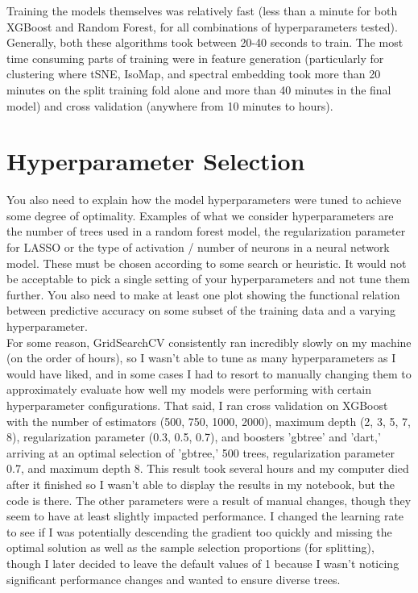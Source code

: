 \documentclass[12pt]{article}
\newtheorem{Proof of Lemma}{Proof of Lemma}
\begin{document}
Training the models themselves was relatively fast (less than a minute for both XGBoost and Random Forest, for all combinations of hyperparameters tested). Generally, both these algorithms took between 20-40 seconds to train. The most time consuming parts of training were in feature generation (particularly for clustering where tSNE, IsoMap, and spectral embedding took more than 20 minutes on the split training fold alone and more than 40 minutes in the final model) and cross validation (anywhere from 10 minutes to hours).

\section{Hyperparameter Selection}
You also need to explain how the model hyperparameters were tuned to achieve some degree of optimality. Examples of what we consider hyperparameters are the number of trees used in a random forest model, the regularization parameter for LASSO or the type of activation / number of neurons in a neural network model. These must be chosen according to some search or heuristic. It would not be acceptable to pick a single setting of your hyperparameters and not tune them further. You also need to make at least one plot showing the functional relation between predictive accuracy on some subset of the training data and a varying hyperparameter. \\

For some reason, GridSearchCV consistently ran incredibly slowly on my machine (on the order of hours), so I wasn't able to tune as many hyperparameters as I would have liked, and in some cases I had to resort to manually changing them to approximately evaluate how well my models were performing with certain hyperparameter configurations. That said, I ran cross validation on XGBoost with the number of estimators (500, 750, 1000, 2000), maximum depth (2, 3, 5, 7, 8), regularization parameter (0.3, 0.5, 0.7), and boosters 'gbtree' and 'dart,' arriving at an optimal selection of 'gbtree,' 500 trees, regularization parameter 0.7, and maximum depth 8. This result took several hours and my computer died after it finished so I wasn't able to display the results in my notebook, but the code is there. The other parameters were a result of manual changes, though they seem to have at least slightly impacted performance. I changed the learning rate to see if I was potentially descending the gradient too quickly and missing the optimal solution as well as the sample selection proportions (for splitting), though I later decided to leave the default values of 1 because I wasn't noticing significant performance changes and wanted to ensure diverse trees. \\
\end{document}
